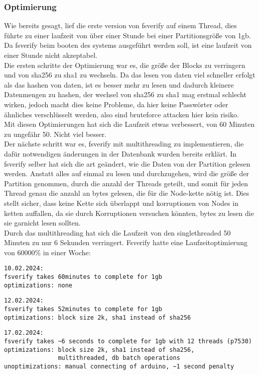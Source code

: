 \subsubsection{Optimierung}
Wie bereits gesagt, lief die erste version von fsverify auf einem Thread, dies führte zu einer laufzeit von über einer Stunde bei einer Partitionsgröße von 1gb. Da fsverify beim booten des systems ausgeführt werden soll, ist eine laufzeit von einer Stunde nicht akzeptabel.
\\
Die ersten schritte der Optimierung war es, die größe der Blocks zu verringern und von sha256 zu sha1 zu wechseln. Da das lesen von daten viel schneller erfolgt als das hashen von daten, ist es besser mehr zu lesen und dadurch kleinere Datenmengen zu hashen, der wechsel von sha256 zu sha1 mag erstmal schlecht wirken, jedoch macht dies keine Probleme, da hier keine Passwörter oder ähnliches verschlüsselt werden, also sind bruteforce attacken hier kein risiko.\\
Mit diesen Optimierungen hat sich die Laufzeit etwas verbessert, von 60 Minuten zu ungefähr 50. Nicht viel besser.
\\
Der nächste schritt war es, fsverify mit multithreading zu implementieren, die dafür notwendigen änderungen in der Datenbank wurden bereits erklärt. In fsverify selber hat sich die art geändert, wie die Daten von der Partition gelesen werden. Anstatt alles auf einmal zu lesen und durchzugehen, wird die größe der Partition genommen, durch die anzahl der Threads geteilt, und somit für jeden Thread genau die anzahl an bytes gelesen, die für die Node-kette nötig ist. Dies stellt sicher, dass keine Kette sich überlappt und korruptionen von Nodes in ketten auffallen, da sie durch Korruptionen versuchen könnten, bytes zu lesen die sie garnicht lesen sollten.\\
Durch das multithreading hat sich die Laufzeit von den singlethreaded 50 Minuten zu nur 6 Sekunden verringert.
\bigbreak \noindent
Fsverify hatte eine Laufzeitoptimierung von 60000\% in einer Woche:
\begin{verbatim}
10.02.2024:
fsverify takes 60minutes to complete for 1gb
optimizations: none
\end{verbatim}
\pagebreak
\begin{verbatim}
12.02.2024:
fsverify takes 52minutes to complete for 1gb
optimizations: block size 2k, sha1 instead of sha256
\end{verbatim}
\begin{verbatim}
17.02.2024:
fsverify takes ~6 seconds to complete for 1gb with 12 threads (p7530)
optimizations: block size 2k, sha1 instead of sha256,
               multithreaded, db batch operations
unoptimizations: manual connecting of arduino, ~1 second penalty
\end{verbatim}

